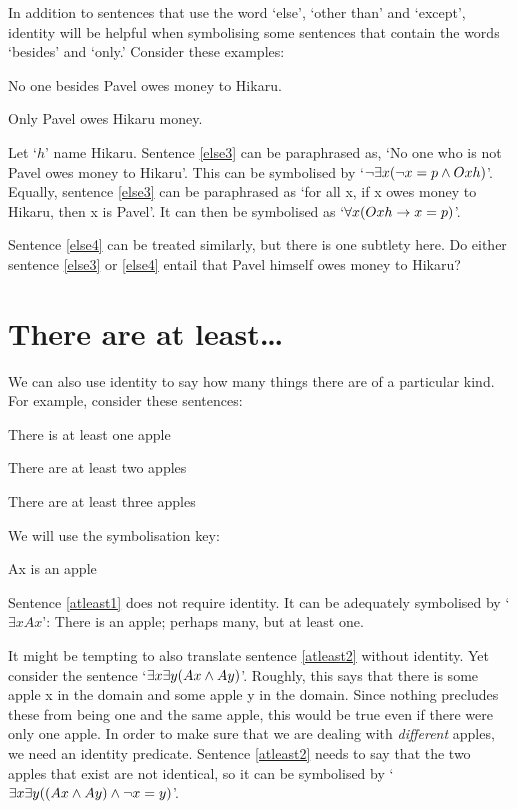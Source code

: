 In addition to sentences that use the word `else', `other than' and `except', identity will be helpful when symbolising some sentences that contain the words `besides' and `only.' Consider these examples:

\begin{earg}
\item[\ex{else3}] No one besides Pavel owes money to Hikaru.
\item[\ex{else4}] Only Pavel owes Hikaru money.
\end{earg}
Let `$h$' name Hikaru. Sentence \ref{else3} can be paraphrased as, `No one who is not Pavel owes money to Hikaru'. This can be symbolised by `$\neg\exists x(\neg x = p \wedge Oxh)$'. Equally, sentence \ref{else3} can be paraphrased as `for all x, if x owes money to Hikaru, then x is Pavel'. It can then be symbolised as `$\forall x (Oxh \rightarrow x = p)$'.

Sentence \ref{else4} can be treated similarly, but there is one subtlety here. Do either sentence \ref{else3} or \ref{else4} entail that Pavel himself owes money to Hikaru? 

\section{There are at least\ldots}
We can also use identity to say how many things there are of a particular kind. For example, consider these sentences:
\begin{earg}
\item[\ex{atleast1}] There is at least one apple
\item[\ex{atleast2}] There are at least two apples
\item[\ex{atleast3}] There are at least three apples
\end{earg}
We will use the symbolisation key:
	\begin{ekey}
		\item[Ax]  is an apple
	\end{ekey}
Sentence \ref{atleast1} does not require identity. It can be adequately symbolised by `$\exists x Ax$': There is an apple; perhaps many, but at least one.

It might be tempting to also translate sentence \ref{atleast2} without identity. Yet consider the sentence `$\exists x \exists y(Ax \wedge Ay)$'. Roughly, this says that there is some apple x in the domain and some apple y in the domain. Since nothing precludes these from being one and the same apple, this would be true even if there were only one apple. In order to make sure that we are dealing with \emph{different} apples, we need an identity predicate. Sentence \ref{atleast2} needs to say that the two apples that exist are not identical, so it can be symbolised by `$\exists x \exists y((Ax \wedge Ay) \wedge \neg x = y)$'.

